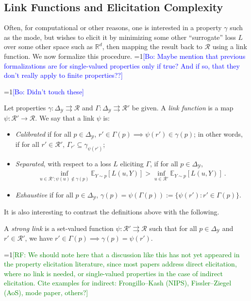 \documentclass[anon,12pt]{colt2019}
\newcommand{\Comments}{1}
\newcommand{\mynote}[2]{\ifnum\Comments=1\textcolor{#1}{#2}\fi}
\newcommand{\raf}[1]{\mynote{green}{[RF: #1]}}
\newcommand{\bo}[1]{\mynote{blue}{[Bo: #1]}}
\newcommand{\reals}{\mathbb{R}}
\newcommand{\simplex}{\Delta_\Y}
\newcommand{\E}{\mathbb{E}}
\newcommand{\R}{\mathcal{R}}
\newcommand{\Y}{\mathcal{Y}}
\newcommand{\toto}{\rightrightarrows}
\begin{document}
\subsection{Link Functions and Elicitation Complexity}\label{sec:link-elic}
Often, for computational or other reasons, one is interested in a property $\gamma$ such as the mode, but wishes to elicit it by minimizing some other ``surrogate'' loss $L$ over some other space such as $\reals^d$, then mapping the result back to $\R$ using a link function.
We now formalize this procedure.
\bo{Maybe mention that previous formalizations are for single-valued properties only if true? And if so, that they don't really apply to finite properties??}

\bo{Didn't touch these}
\begin{definition}\label{def:links}
  Let properties $\gamma:\simplex\toto\R$ and $\Gamma:\simplex\toto\R'$ be given.
  A \emph{link function} is a map $\psi:\R'\to\R$.
  We say that a link $\psi$ is:
  \begin{itemize}
  \item \emph{Calibrated} if for all $p\in\simplex$, $r'\in \Gamma(p) \implies \psi(r') \in \gamma(p)$; in other words, if for all $r'\in\R'$, $\Gamma_{r'} \subseteq \gamma_{\psi(r')}$;
  \item \emph{Separated}, with respect to a loss $L$ eliciting $\Gamma$, if for all $p \in \simplex$,
  \begin{align*}
  \inf_{u \in \R'; \psi(u) \not \in \gamma(p)} \E_{Y\sim p}[L(u, Y)] > \inf_{u \in \R'}\E_{Y\sim p}[L(u, Y)]~.
  \end{align*}
  \item \emph{Exhaustive} if for all $p\in\simplex$, $\gamma(p) = \psi(\Gamma(p)) := \{\psi(r') : r'\in\Gamma(p)\}$.
  \end{itemize}
\end{definition}

It is also interesting to contrast the definitions above with the following.
\begin{definition}
  A \emph{strong link} is a set-valued function $\psi:\R'\toto\R$ such that for all $p\in\simplex$ and $r'\in\R'$, we have $r'\in\Gamma(p) \implies \gamma(p) = \psi(r')$.
\end{definition}

\raf{We should note here that a discussion like this has not yet appeared in the property elicitation literature, since most papers address direct elicitation, where no link is needed, or single-valued properties in the case of indirect elicitation.  Cite examples for indirect: Frongillo--Kash (NIPS), Fissler--Ziegel (AoS), mode paper, others?}
\end{document}
